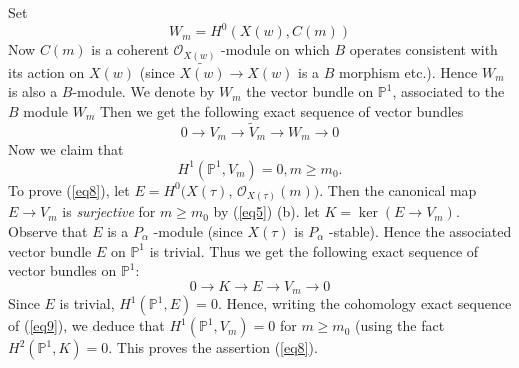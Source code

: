 \begin{rem}
\begin{equation*}
\end{equation*}
Set 
\begin{equation*}
W_m=H^{0}(X(w), C(m))
\end{equation*}
Now $C(m)$ is a coherent $\mathscr{O}_{X(w)}$ -module on which $B$ operates consistent with its action on $X(w)$ (since $\widetilde{X(w)}\to X(w)$ is a $B$ morphism etc.). Hence $W_m$ is also a $B$-module. We denote by $W_m$ the vector bundle on $\mathbb{P}^{1}$, associated to the $B$ module $W_m$ Then we get the following exact sequence of vector bundles 
\begin{equation*}\label{eq7}
0\to V_m\to \widetilde{V}_m\to W_m\to 0\tag{7}
\end{equation*}
Now we claim that 
\begin{equation*}\label{eq8}
H^{1}\left(\mathbb{P}^{1}, V_m\right)=0, m\geq m_0. \tag{8}
\end{equation*}
To prove (\ref{eq8}), let $E=H^{0}(X(\tau)$, $\mathscr{O}_{X(\tau)}(m))$. Then the canonical map $E\to V_m$ is \textit{surjective} for $m\geq m_0$ by (\ref{eq5}) (b). let $K=\ker (E\to V_m)$. Observe that $E$ is a $P_{\alpha}$ -module (since $X(\tau)$ is $P_{\alpha}$ -stable). Hence the associated vector bundle $E$ on $\mathbb{P}^{1}$ is trivial. Thus we get the following exact sequence of vector bundles on $\mathbb{P}^{1}$: 
\begin{equation*}\label{eq9}
0\to K\to E\to V_m\to 0\tag{9}
\end{equation*}
\pageoriginale
Since $E$ is trivial, $H^{1}\left(\mathbb{P}^{1}, E\right)=0$. Hence, writing the cohomology exact sequence of (\ref{eq9}), we deduce that $H^{1}\left(\mathbb{P}^{1}, V_m\right)=0$ for $m\geq m_0$ (using the fact $H^{2}\left(\mathbb{P}^{1}, K\right)=0$. This proves the assertion (\ref{eq8}). 


\end{rem}
